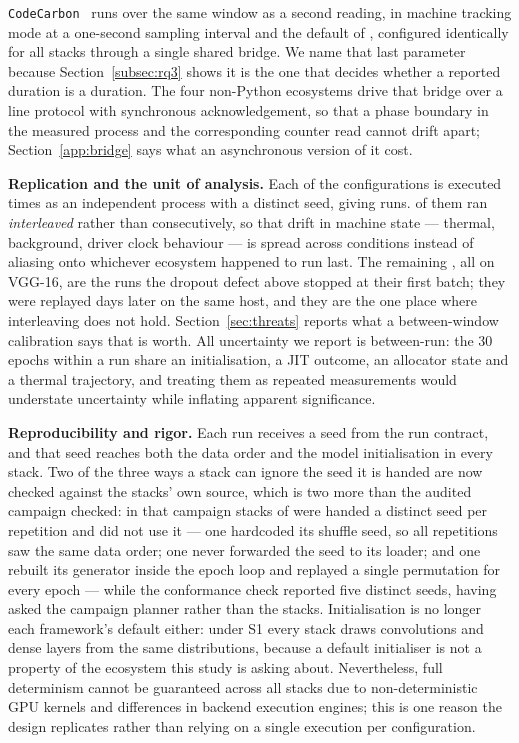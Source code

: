 \texttt{CodeCarbon}~\citep{codecarbon} runs over the same window as
a second reading, in machine tracking mode at a one-second
sampling interval and the default  of
\vMechApiCallInterval{}, configured identically for all \vEcosystems{} stacks
through a single shared bridge. We name that last parameter because
Section~\ref{subsec:rq3} shows it is the one that decides whether a reported
duration is a duration. The four non-Python ecosystems drive that bridge over a
line protocol with synchronous acknowledgement, so that a phase boundary in the
measured process and the corresponding counter read cannot drift apart;
Section~\ref{app:bridge} says what an asynchronous version of it cost.



\textbf{Replication and the unit of analysis.} Each of the \vConfigurations{}
configurations is executed \vRepetitions{} times as an independent process with
a distinct seed, giving \vRuns{} runs. \vInterleavedRuns{} of them ran
\emph{interleaved} rather than consecutively, so that drift in machine state ---
thermal, background, driver clock behaviour --- is spread across conditions
instead of aliasing onto whichever ecosystem happened to run last. The remaining
\vLateRuns{}, all \vLateEcosystems{} on VGG-16, are the runs the dropout defect
above stopped at their first batch; they were replayed \vLateGapDays{} days later
on the same host, and they are the one place where interleaving does not hold.
Section~\ref{sec:threats} reports what a between-window calibration says that is
worth. All uncertainty we
report is between-run: the 30 epochs within a run share an initialisation, a JIT
outcome, an allocator state and a thermal trajectory, and treating them as
repeated measurements would understate uncertainty while inflating apparent
significance.



\textbf{Reproducibility and rigor.}
Each run receives a seed from the run contract, and that seed reaches both the
data order and the model initialisation in every stack. Two of the three ways a
stack can ignore the seed it is handed are now checked against the stacks' own
source, which is two more than the audited campaign checked: in that
campaign
\vSeedDivergentStacks{} stacks of \vEcosystems{} were handed a distinct seed per
repetition and did not use it --- one hardcoded its shuffle seed, so all
\vRepetitions{} repetitions saw the same data order; one never forwarded the seed
to its loader; and one rebuilt its generator inside the epoch loop and replayed a
single permutation for every epoch --- while the conformance check reported five
distinct seeds, having asked the campaign planner rather than the stacks.
Initialisation is no longer each framework's default either: under S1 every stack
draws convolutions and dense layers from the same distributions, because a
default initialiser is not a property of the ecosystem this study is asking
about.
Nevertheless, full determinism cannot be guaranteed across all stacks due to non-deterministic GPU kernels and differences in backend execution engines; this is one reason the design replicates rather than relying on a single execution per configuration.


